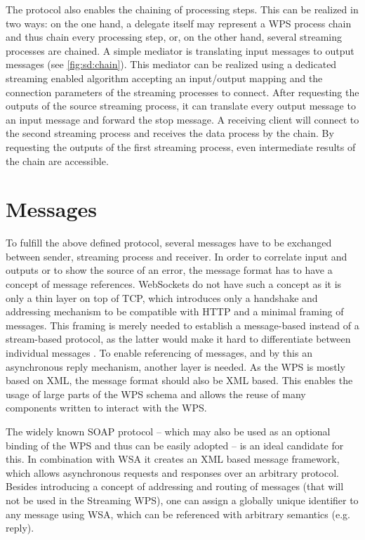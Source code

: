     The protocol also enables the chaining of processing steps. This can be realized in two ways: on the one hand, a delegate itself may represent a \ac{WPS} process chain and thus chain every processing step, or, on the other hand, several streaming processes are chained. A simple mediator is translating input messages to output messages (see \cref{fig:sd:chain}). This mediator can be realized using a dedicated streaming enabled algorithm accepting an input/output mapping and the connection parameters of the streaming processes to connect. After requesting the outputs of the source streaming process, it can translate every output message to an input message and forward the stop message. A receiving client will connect to the second streaming process and receives the data process by the chain. By requesting the outputs of the first streaming process, even intermediate results of the chain are accessible.

  \section{Messages}
    \label{sec:streaming:messages}
    To fulfill the above defined protocol, several messages have to be exchanged between sender, streaming process and receiver. In order to correlate input and outputs or to show the source of an error, the message format has to have a concept of message references. WebSockets do not have such a concept as it is only a thin layer on top of TCP, which introduces only a handshake and addressing mechanism to be compatible with HTTP and a minimal framing of messages. This framing is merely needed to establish a message-based instead of a stream-based protocol, as the latter would make it hard to differentiate between individual messages \citep{ietf:rfc6455}. To enable referencing of messages, and by this an asynchronous reply mechanism, another layer is needed. As the \ac{WPS} is mostly based on \ac{XML}, the message format should also be \ac{XML} based. This enables the usage of large parts of the \ac{WPS} schema and allows the reuse of many components written to interact with the \ac{WPS}.

    The widely known SOAP protocol \citep{w3c:soap1} -- which may also be used as an optional binding of the \ac{WPS} \citep{ogc:wps} and thus can be easily adopted -- is an ideal candidate for this. In combination with \ac{WSA} \citep{w3c:wsa} it creates an \ac{XML} based message framework, which allows asynchronous requests and responses over an arbitrary protocol. Besides introducing a concept of addressing and routing of messages (that will not be used in the Streaming \ac{WPS}), one can assign a globally unique identifier to any message using \ac{WSA}, which can be referenced with arbitrary semantics (e.g. reply).

